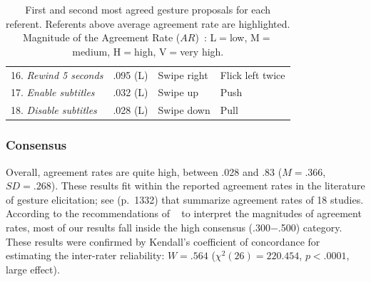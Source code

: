 \begin{table}[ht]
{\begin{tabular}{lrll}
        16. \textit{Rewind 5 seconds} & .095 (L) & \textsf{Swipe right} & \textsf{Flick left twice} \\
        17. \textit{Enable subtitles} & .032 (L) & \textsf{Swipe up} & \textsf{Push} \\
        18. \textit{Disable subtitles} & .028 (L) & \textsf{Swipe down} & \textsf{Pull} \\
        \bottomrule
	\end{tabular}
	}
	\caption{First and second most agreed gesture proposals for each referent. Referents above average agreement rate are highlighted. Magnitude of the Agreement Rate ($AR$)~\cite{Vatavu:2015}: L${=}$low, M${=}$medium, H${=}$high, V${=}$very high.}
	\label{tbl:lui-ges:gesture-proposals}
	\vspace{-8pt}
\end{table}


\subsubsection{Consensus}
Overall, agreement rates are quite high, between .028 and .83 ($M{=}.366$, $SD{=}.268$). These results fit within the reported agreement rates in the literature of gesture elicitation; see \cite{Vatavu:2015} (\mbox{p. 1332}) that summarize agreement rates of 18 studies. According to the recommendations of ~\cite{Vatavu:2015} to interpret the magnitudes of agreement rates, most of our results fall inside the high consensus (.300$-$.500) category. These results were confirmed by Kendall's coefficient of concordance for estimating the inter-rater reliability:
$W{=}.564$ ($\chi^2(26){=}220.454$, $p{<}.0001$, large effect).

